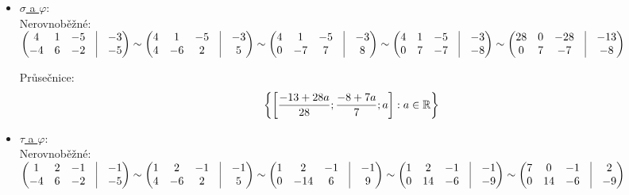 \begin{itemize}
	\item \underline{$\sigma$ a $\varphi$}: \\
		Nerovnoběžné:\\
		 $  \begin{pmatrix}
			 4 &1 &-5 &\vline& -3 \\ 
			 -4 &6 &-2 &\vline& -5 \\ 
		 \end{pmatrix}
		 \sim
		 \begin{pmatrix}
			 4 &1 &-5 &\vline& -3 \\ 
			 4 &-6 &2 &\vline& 5 \\ 
		 \end{pmatrix}
		 \sim
		 \begin{pmatrix}
			 4 &1 &-5 &\vline& -3 \\ 
			 0 &-7 &7 &\vline& 8 \\ 
		 \end{pmatrix}
		 \sim
		 \begin{pmatrix}
			 4 &1 &-5 &\vline& -3 \\ 
			 0 &7 &-7 &\vline& -8 \\ 
		 \end{pmatrix}
		 \sim
		 \begin{pmatrix}
			 28 &0 &-28 &\vline& -13 \\ 
			 0 &7 &-7 &\vline& -8 \\ 
		 \end{pmatrix}
		 $

		Průsečnice:
		 $$ 
		  \left\{{\left[{\frac{-13+28 a}{28}; \frac{-8+7 a}{7}; a}\right]:a \in \mathbb{R}}\right\} 
		   $$ 
	\item \underline{$\tau$ a $\varphi$}: \\
		Nerovnoběžné:\\
		 $ \begin{pmatrix}
			 1 &2 &-1 &\vline& -1 \\ 
			 -4 &6 &-2 &\vline& -5 \\ 
		 \end{pmatrix}
		 \sim
		 \begin{pmatrix}
			 1 &2 &-1 &\vline& -1 \\ 
			 4 &-6 &2 &\vline& 5 \\ 
		 \end{pmatrix}
		 \sim
		 \begin{pmatrix}
			 1 &2 &-1 &\vline& -1 \\ 
			 0 &-14 &6 &\vline& 9 \\ 
		 \end{pmatrix}
		 \sim
		 \begin{pmatrix}
			 1 &2 &-1 &\vline& -1 \\ 
			 0 &14 &-6 &\vline& -9 \\ 
		 \end{pmatrix}
		 \sim
		 \begin{pmatrix}
			 7 &0 &-1 &\vline& 2 \\ 
			 0 &14 &-6 &\vline& -9 \\ 
		 \end{pmatrix}
		 $



\end{itemize}
